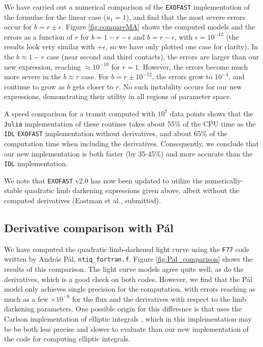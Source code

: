 \documentclass[modern,trackchanges]{aastex63}
\newcommand{\edited}{}
\begin{document}
We have carried out a numerical comparison of the \texttt{EXOFAST} implementation
of the \citet{MandelAgol2002} formulae for the linear case ($u_1=1$), and find 
that the most severe errors occur for $b = r \pm \epsilon$.  Figure \ref{fig:compareMA} 
shows the computed models and the errors as a function of $r$ for $b=1-r-\epsilon$
and $b=r-\epsilon$, with $\epsilon = 10^{-12}$ (the results look very
similar with $+\epsilon$, so we have only plotted one case for clarity).
In the $b\approx 1-r$ case (near second and third contacts), the errors
are larger than our new expression, reaching $\approx 10^{-10}$ for
$r = 1$.  However, the errors become much more severe in the $b \approx r$
case.  For $b=r \pm 10^{-12}$, the errors grow to $10^{-4}$, and continue
to grow as $b$ gets closer to $r$.  No such instability occurs for
our new expressions, demonstrating their utility in all regions of
parameter space.

A speed comparison for a transit computed with $10^7$ data points shows that
the \texttt{Julia} implementation of these routines takes about 55\% of the CPU
time as the \texttt{IDL} \texttt{EXOFAST} implementation without derivatives, and about 65\%
of the computation time when including the derivatives.  Consequently, we
conclude that our new implementation is both faster (by 35-45\%) and more
accurate than the \cite{MandelAgol2002} \texttt{IDL} implementation.  

We note that \texttt{EXOFAST} v2.0 has now been updated to utilize the numerically-stable 
quadratic limb darkening expressions given above, albeit without the computed 
derivatives (Eastman et al., submitted).

\subsection{Derivative comparison with P\'al}

We have computed the quadratic limb-darkened light curve using the \texttt{F77}
code written by Andr\'as P\'al, \texttt{ntiq\_fortran.f}.
Figure \ref{fig:Pal_comparison} shows the results of this comparison.
The light curve models agree quite well, as do the derivatives, which is
a good check on both codes.  However, we find that the P\'al model only
achieves single precision for the computation, with errors reaching as
much as a few $\times 10^{-8}$ for the flux and the derivatives with
respect to the limb darkening parameters.  {\edited One possible origin
for this difference is that} \citet{Pal2008} uses the
Carlson implementation of elliptic integrals \citep{Carlson1979},
which {\edited in this implementation may be} be both less precise and slower to
evaluate than {\edited our new implementation of the}  \citet{Bulirsch1965a} code 
for computing elliptic integrals.
\end{document}
